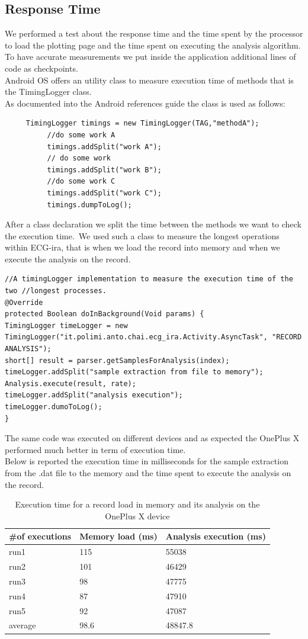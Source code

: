 \subsection{Response Time}
We performed a test about the response  time and the time spent by the processor to load the plotting page and the time spent on executing the analysis algorithm.\\
To have accurate measurements we put inside the application additional lines of code as checkpoints.\\
Android OS offers an utility class to measure execution time of methods that is the TimingLogger class.\\
As documented into the Android references guide the class is used as follows:
\begin{lstlisting}
     TimingLogger timings = new TimingLogger(TAG,"methodA");
          //do some work A
          timings.addSplit("work A");
          // do some work 
          timings.addSplit("work B");
          //do some work C
          timings.addSplit("work C");
          timings.dumpToLog();
\end{lstlisting}
After a class declaration we split the time between the methods we want to check the execution time.\
We used such a class to measure the longest operations within ECG-ira, that is when we load the record into memory and when we execute the analysis on the record.
\begin{lstlisting}
//A timingLogger implementation to measure the execution time of the two //longest processes.
@Override
protected Boolean doInBackground(Void params) {
TimingLogger timeLogger = new TimingLogger("it.polimi.anto.chai.ecg_ira.Activity.AsyncTask", "RECORD ANALYSIS");
short[] result = parser.getSamplesForAnalysis(index);
timeLogger.addSplit("sample extraction from file to memory");
Analysis.execute(result, rate);
timeLogger.addSplit("analysis execution");
timeLogger.dumoToLog();
}
\end{lstlisting}
The same code was executed on different devices and as expected the OnePlus X performed much better in term of execution time.\\
Below is reported the execution time in milliseconds for the sample extraction from the .dat file to the memory and the time spent to execute the analysis on the record.\\
\begin{table}[h]
\begin{tabularx}{\textwidth}{|X|X|X|}
	\hline
	\textbf{\#of executions} & \textbf{Memory load (ms)} &\textbf{Analysis execution (ms)}  \\ \hline
	run1 & 115 & 55038  \\ \hline
	run2 & 101 & 46429 \\ \hline
	run3 & 98 & 47775 \\ \hline
	run4 & 87 & 47910 \\ \hline
	run5 & 92 & 47087 \\ \hline
	average & 98.6 & 48847.8 \\ \hline
	
\end{tabularx}
\caption{Execution time for a record load in memory and its analysis on the OnePlus X device}
\label{tab10.2}
\end{table}
